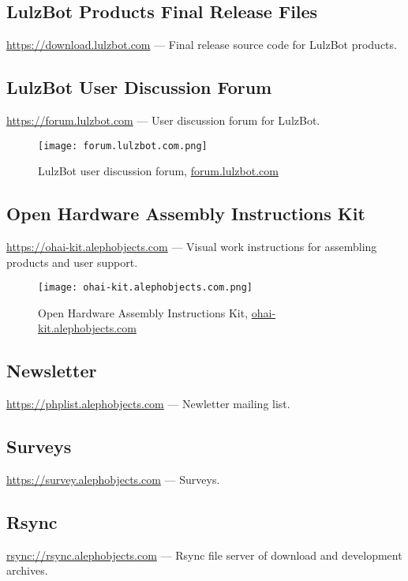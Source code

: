 \subsection{LulzBot Products Final Release Files}
\url{https://download.lulzbot.com} --- Final release source code for
LulzBot products.

\subsection{LulzBot User Discussion Forum}
\url{https://forum.lulzbot.com} --- User discussion forum for LulzBot.
\begin{figure}[h!]
\texttt{[image: forum.lulzbot.com.png]}
 \caption{LulzBot user discussion forum, \href{forum.lulzbot.com}{forum.lulzbot.com}}
 \label{fig:forumlulzbotcom}
\end{figure}

\subsection{Open Hardware Assembly Instructions Kit}
\url{https://ohai-kit.alephobjects.com} --- Visual work instructions for
assembling products and user support.
\begin{figure}[h!]
\texttt{[image: ohai-kit.alephobjects.com.png]}
 \caption{Open Hardware Assembly Instructions Kit, \href{ohai-kit.alephobjects.com}{ohai-kit.alephobjects.com}}
 \label{fig:ohaikitalephobjectscom}
\end{figure}

\subsection{Newsletter}
\url{https://phplist.alephobjects.com} --- Newletter mailing list.

\subsection{Surveys}
\url{https://survey.alephobjects.com} --- Surveys.

\subsection{Rsync}
\url{rsync://rsync.alephobjects.com} --- Rsync file server of download
and development archives.

